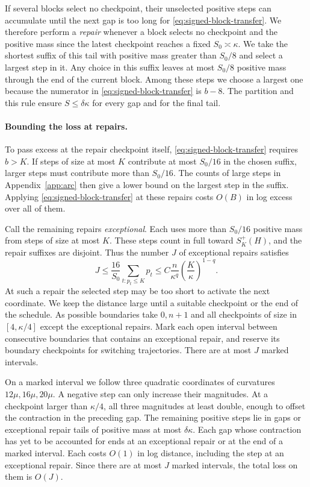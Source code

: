 \documentclass[11pt]{article}
\theoremstyle{definition}
\begin{document}
If several blocks select no checkpoint, their unselected positive steps
can accumulate until the next gap is too long for \eqref{eq:signed-block-transfer}.
We therefore perform a \emph{repair} whenever a block selects no checkpoint
and the positive mass since the latest checkpoint reaches a fixed
\(S_0\asymp\kappa\). We take the shortest suffix of this tail with
positive mass greater than \(S_0/8\) and select a largest step in it.
Any choice in this suffix leaves at most \(S_0/8\) positive mass through
the end of the current block. Among these steps we choose a largest one
because the numerator in \eqref{eq:signed-block-transfer} is \(b-8\). The partition and this
rule ensure \(S\le\delta\kappa\) for every gap and for the final tail.

\paragraph{Bounding the loss at repairs.}
To pass excess at the repair checkpoint itself, \eqref{eq:signed-block-transfer}
requires \(b>K\). If steps of size at most \(K\) contribute at most
\(S_0/16\) in the chosen
suffix, larger steps must contribute more than \(S_0/16\). The counts of
large steps in Appendix~\ref{app:arc} then give a lower bound on the
largest step in the suffix. Applying \eqref{eq:signed-block-transfer} at
these repairs costs \(O(B)\) in log excess over all of them.

Call the remaining repairs \emph{exceptional}. Each uses more than \(S_0/16\)
positive mass from steps of size at most \(K\). These steps count in full
toward \(S_K^+(H)\), and the repair suffixes are disjoint. Thus the number
\(J\) of exceptional repairs satisfies
\begin{equation}\label{eq:signed-exception-count}
 J\le\frac{16}{S_0}\sum_{t:p_t\le K}p_t
   \le C\frac{n}{\kappa^q}\left(\frac K\kappa\right)^{1-q}.
\end{equation}
At such a repair the selected step may be too short to activate the next
coordinate. We keep the distance large until a suitable checkpoint or the
end of the schedule. As possible boundaries take \(0,n+1\) and all
checkpoints of size in \([4,\kappa/4]\) except the exceptional repairs. Mark each open interval between consecutive boundaries
that contains an exceptional repair, and reserve its boundary checkpoints
for switching trajectories. There are at most \(J\) marked intervals.

On a marked interval we follow three quadratic coordinates of curvatures
\(12\mu,16\mu,20\mu\). A negative step can only increase their magnitudes.
At a checkpoint larger than \(\kappa/4\), all three magnitudes at least
double, enough to offset the contraction in the preceding gap. The
remaining positive steps lie in gaps or exceptional repair tails of
positive mass at most \(\delta\kappa\). Each gap whose contraction has
yet to be accounted for ends at an exceptional repair or at the end of a
marked interval. Each costs \(O(1)\) in log distance, including the step
at an exceptional repair. Since there are at most \(J\) marked intervals,
the total loss on them is \(O(J)\).
\end{document}

